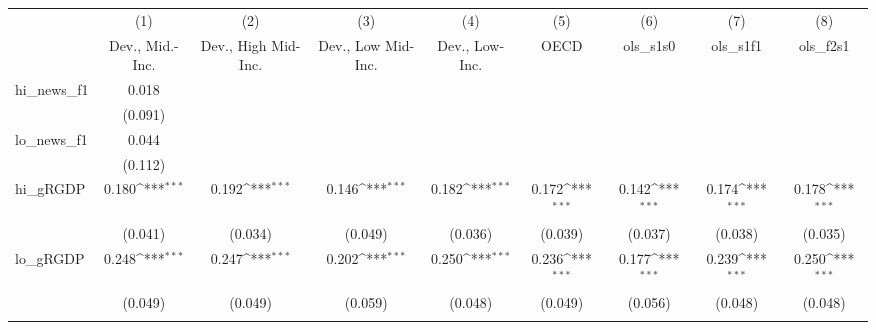 {
\def\sym#1{\ifmmode^{#1}\else\(^{#1}\)\fi}
\begin{tabular}{l*{8}{c}}
\toprule
            &\multicolumn{1}{c}{(1)}&\multicolumn{1}{c}{(2)}&\multicolumn{1}{c}{(3)}&\multicolumn{1}{c}{(4)}&\multicolumn{1}{c}{(5)}&\multicolumn{1}{c}{(6)}&\multicolumn{1}{c}{(7)}&\multicolumn{1}{c}{(8)}\\
            &\multicolumn{1}{c}{Dev., Mid.-Inc.}&\multicolumn{1}{c}{Dev., High Mid-Inc.}&\multicolumn{1}{c}{Dev., Low Mid-Inc.}&\multicolumn{1}{c}{Dev., Low-Inc.}&\multicolumn{1}{c}{OECD}&\multicolumn{1}{c}{ols\_s1s0}&\multicolumn{1}{c}{ols\_s1f1}&\multicolumn{1}{c}{ols\_f2s1}\\
\midrule
hi\_news\_f1  &       0.018         &                     &                     &                     &                     &                     &                     &                     \\
            &     (0.091)         &                     &                     &                     &                     &                     &                     &                     \\
\addlinespace
lo\_news\_f1  &       0.044         &                     &                     &                     &                     &                     &                     &                     \\
            &     (0.112)         &                     &                     &                     &                     &                     &                     &                     \\
\addlinespace
hi\_gRGDP    &       0.180\sym{***}&       0.192\sym{***}&       0.146\sym{***}&       0.182\sym{***}&       0.172\sym{***}&       0.142\sym{***}&       0.174\sym{***}&       0.178\sym{***}\\
            &     (0.041)         &     (0.034)         &     (0.049)         &     (0.036)         &     (0.039)         &     (0.037)         &     (0.038)         &     (0.035)         \\
\addlinespace
lo\_gRGDP    &       0.248\sym{***}&       0.247\sym{***}&       0.202\sym{***}&       0.250\sym{***}&       0.236\sym{***}&       0.177\sym{***}&       0.239\sym{***}&       0.250\sym{***}\\
            &     (0.049)         &     (0.049)         &     (0.059)         &     (0.048)         &     (0.049)         &     (0.056)         &     (0.048)         &     (0.048)         \\
\addlinespace

\end{tabular}}
